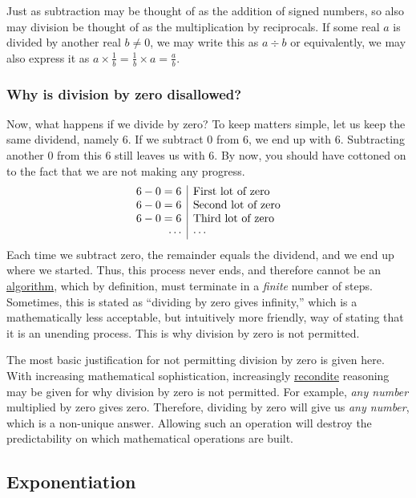 \documentclass[
  a4paper,
]{article}
\begin{document}
Just as subtraction may be thought of as the addition of signed numbers,
so also may division be thought of as the multiplication by reciprocals.
If some real \(a\) is divided by another real \(b \ne 0\), we may write
this as \(a \div b\) or equivalently, we may also express it as
\(a \times \frac{1}{b} = \frac{1}{b} \times a = \frac{a}{b}\).

\hypertarget{why-is-division-by-zero-disallowed}{%
\subsubsection{Why is division by zero
disallowed?}\label{why-is-division-by-zero-disallowed}}

Now, what happens if we divide by zero? To keep matters simple, let us
keep the same dividend, namely 6. If we subtract 0 from 6, we end up
with 6. Subtracting another 0 from this 6 still leaves us with 6. By
now, you should have cottoned on to the fact that we are not making any
progress. \[
\begin{array}{r | l}
6 - 0 = 6 & \mbox{First lot of zero}\\
6 - 0 = 6 & \mbox{Second lot of zero}\\
6 - 0 = 6 & \mbox{Third lot of zero}\\
\cdots & \cdots\\
\end{array}
\] Each time we subtract zero, the remainder equals the dividend, and we
end up where we started. Thus, this process never ends, and therefore
cannot be an
\href{https://mathworld.wolfram.com/Algorithm.html}{algorithm}, which by
definition, must terminate in a \emph{finite} number of steps.
Sometimes, this is stated as ``dividing by zero gives infinity,'' which
is a mathematically less acceptable, but intuitively more friendly, way
of stating that it is an unending process. This is why division by zero
is not permitted.

The most basic justification for not permitting division by zero is
given here. With increasing mathematical sophistication, increasingly
\href{https://www.merriam-webster.com/dictionary/recondite}{recondite}
reasoning may be given for why division by zero is not permitted. For
example, \emph{any number} multiplied by zero gives zero. Therefore,
dividing by zero will give us \emph{any number}, which is a non-unique
answer. Allowing such an operation will destroy the predictability on
which mathematical operations are built.

\hypertarget{exponentiation}{%
\subsection{Exponentiation}\label{exponentiation}}
\end{document}
